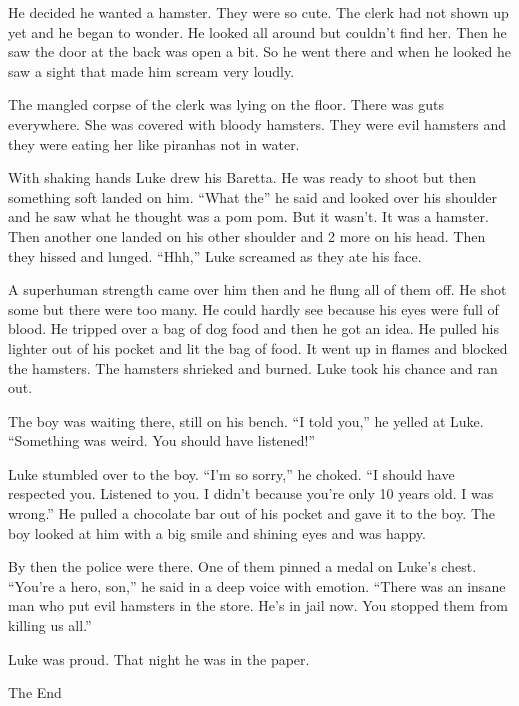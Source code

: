He decided he wanted a hamster. They were so cute. The clerk had
not shown up yet and he began to wonder. He looked all around but
couldn't find her. Then he saw the door at the back was open a bit.
So he went there and when he looked he saw a sight that made him
scream very loudly.



The mangled corpse of the clerk was lying on the floor. There was
guts everywhere. She was covered with bloody hamsters. They were
evil hamsters and they were eating her like piranhas not in
water.



With shaking hands Luke drew his Baretta. He was ready to shoot but
then something soft landed on him. ``What the'' he said and looked
over his shoulder and he saw what he thought was a pom pom. But it
wasn't. It was a hamster. Then another one landed on his other
shoulder and 2 more on his head. Then they hissed and lunged.
``Hhh,'' Luke screamed as they ate his face.



A superhuman strength came over him then and he flung all of them
off. He shot some but there were too many. He could hardly see
because his eyes were full of blood. He tripped over a bag of dog
food and then he got an idea. He pulled his lighter out of his
pocket and lit the bag of food. It went up in flames and blocked
the hamsters. The hamsters shrieked and burned. Luke took his
chance and ran out.



The boy was waiting there, still on his bench. ``I told you,'' he
yelled at Luke. ``Something was weird. You should have
listened!''



Luke stumbled over to the boy. ``I'm so sorry,'' he choked. ``I should
have respected you. Listened to you. I didn't because you're only
10 years old. I was wrong.'' He pulled a chocolate bar out of his
pocket and gave it to the boy. The boy looked at him with a big
smile and shining eyes and was happy.



By then the police were there. One of them pinned a medal on Luke's
chest. ``You're a hero, son,'' he said in a deep voice with emotion.
``There was an insane man who put evil hamsters in the store. He's
in jail now. You stopped them from killing us all.''



Luke was proud. That night he was in the paper.



The End 
 



